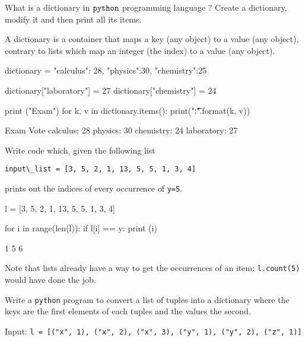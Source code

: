\begin{question}
What is a dictionary in \(\tt{python}\) programming language ? Create a dictionary, modify it and then print all its items.
\end{question}

\cprotEnv\begin{solution}
A dictionary is a container that maps a key (any object) to a value (any object), contrary to lists which map an integer (the index) to a value (any object).

\begin{ipython}
dictionary = {"calculus": 28, "physics":30, "chemistry":25}

dictionary["laboratory"] = 27
dictionary["chemistry"] = 24

print ("Exam\tVote")
for k, v in dictionary.items():
    print("{}:\t{}".format(k, v))
\end{ipython}
\begin{ioutput}
Exam            Vote
calculus:       28
physics:        30
chemistry:      24
laboratory:     27
\end{ioutput}
\end{solution}

\begin{question}
Write code which, given the following list 

\lstinline[language=iPython]|input\_list = [3, 5, 2, 1, 13, 5, 5, 1, 3, 4]|

\noindent
prints out the indices of every occurrence of \lstinline[language=iPython]|y=5|.
\end{question}

\cprotEnv\begin{solution}
\begin{ipython}
l = [3, 5, 2, 1, 13, 5, 5, 1, 3, 4]

for i in range(len(l)):
    if l[i] == y:
        print (i)
\end{ipython}
\begin{ioutput}
1
5
6
\end{ioutput}
Note that lists already have a way to get the occurrences of an item: \texttt{l.count(5)} would have done the job.
\end{solution}

\begin{question}
Write a \texttt{python} program to convert a list of tuples into a dictionary where the keys are the first elements of each tuples and the values the second.

\noindent
Input: \lstinline[language=iPython]|l = [("x", 1), ("x", 2), ("x", 3), ("y", 1), ("y", 2), ("z", 1)]|
\end{question}

